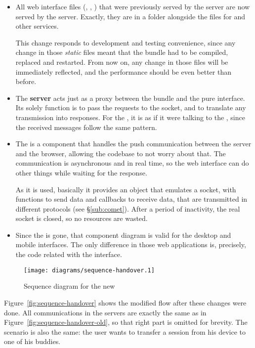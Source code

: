 \begin{itemize}
  \item All web interface files (, , ) that were previously served by the  server are now served by the  server.
  Exactly, they are in a folder alongside the  files for  and other services.
  
  This change responds to development and testing convenience, since any change in those \emph{static} files meant that the  bundle had to be compiled, replaced and restarted.
  From now on, any change in those files will be immediately reflected, and the performance should be even better than before.
  \item The \textbf{ server} acts just as a proxy between the  bundle and the pure  interface.
  Its solely function is to pass the  requests to the  socket, and to translate any  transmission into  responses.
  For the , it is as if it were talking to the , since the received messages follow the same pattern.
  \item The \textbf{ } is a  component that handles the push communication between the server and the browser, allowing the  codebase to not worry about that.
  The communication is asynchronous and in real time, so the web interface can do other things while waiting for the response.
  
  As it is used, basically it provides an object that emulates a  socket, with functions to send data and callbacks to receive data, that are transmitted in different  protocols (see \S\vref{sub:comet}).
  After a period of inactivity, the real socket is closed, so no resources are wasted.
  \item Since the  is gone, that component diagram is valid for the desktop and mobile interfaces.
  The only difference in those web applications is, precisely, the code related with the interface.
\end{itemize}

\begin{figure}[htbp]
  \centering
    \texttt{[image: diagrams/sequence-handover.1]}
  \caption{Sequence diagram for the new }
  \label{fig:sequence-handover}
\end{figure}

Figure~\vref{fig:sequence-handover} shows the modified flow after these changes were done.
All communications in the servers are exactly the same as in Figure~\vref{fig:sequence-handover-old}, so that right part is omitted for brevity.
The scenario is also the same: the user wants to transfer a session from his device to one of his buddies.

